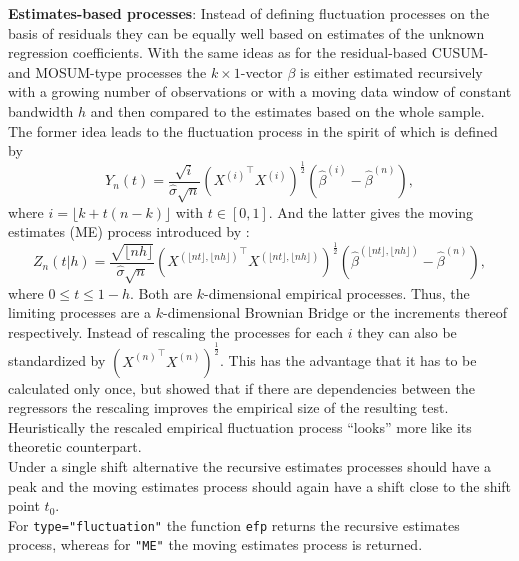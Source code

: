 \documentclass[10pt,a4paper]{article}
\begin{document}
{\bf Estimates-based processes}:
Instead of defining fluctuation processes on the basis of residuals they
can be equally well based on estimates of the unknown regression coefficients.
With the same ideas as for the residual-based CUSUM- and MOSUM-type processes
the $k \times 1$-vector $\beta$ is either estimated recursively with a growing
number of observations or with a moving data window of constant bandwidth $h$
and then compared to the estimates based on the whole sample.
The former idea leads to the fluctuation process  in the spirit of
\cite{Z:Ploberger+Kraemer+Kontrus:1989} which is defined by
\begin{equation}
\label{fluctuation} Y_n \left(t \right) = \frac{\sqrt{i}}{\hat \sigma
\sqrt{n}}  \left({X^{(i)}}^\top X^{(i)} \right)^{\frac{1}{2}} \left( \hat
\beta^{(i)} - \hat \beta^{(n)} \right), \end{equation}
where $i = \lfloor k + t(n-k) \rfloor$ with $t \in [0,1]$. And the latter gives
the moving estimates (ME) process introduced by \cite{Z:Chu+Hornik+Kuan:1995a}:
\begin{equation} \label{ME}
Z_n \left( \left. t \right| h \right) = \frac{\sqrt{\lfloor nh
\rfloor}}{\hat \sigma \sqrt{n}} \left({X^{(\lfloor nt \rfloor, \lfloor nh
 \rfloor)}}^\top X^{(\lfloor nt \rfloor,
\lfloor nh \rfloor)} \right)^{\frac{1}{2}} \left( \hat \beta^{(\lfloor nt
 \rfloor,\lfloor nh
\rfloor)} - \hat \beta^{(n)} \right), \end{equation}
where $0 \le t \le 1-h$.
Both are $k$-dimensional empirical processes. Thus, the limiting processes are a
$k$-dimensional Brownian Bridge or the increments thereof respectively. Instead
of rescaling the processes for each $i$ they can also be standardized by
$\left( {X^{(n)}}^\top X^{(n)} \right)^{\frac{1}{2}}$. This has the
advantage that it has to be calculated only once, but \cite{Z:Kuan+Chen:1994}
showed that if there are dependencies between the regressors the rescaling
improves the empirical size of the resulting test. Heuristically the rescaled
empirical fluctuation process ``looks'' more like its theoretic counterpart.\\

Under a single shift alternative the recursive estimates processes should
have a peak and the moving estimates process
should again have a shift close to the shift point $t_0$.\\

For {\tt type="fluctuation"} the function {\tt efp} returns the recursive
estimates process, whereas for {\tt "ME"} the moving estimates process is
returned.\\
\end{document}
